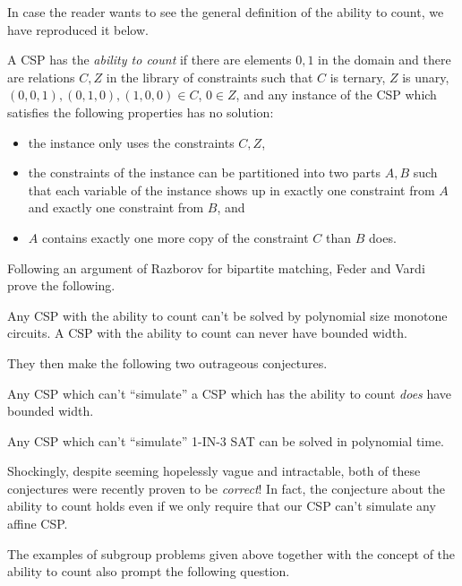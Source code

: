 \documentclass[letterpaper,11pt]{article}
\begin{document}
In case the reader wants to see the general definition of the ability to count, we have reproduced it below.

\begin{defn} A CSP has the \emph{ability to count} if there are elements $0,1$ in the domain and there are relations $C, Z$ in the library of constraints such that $C$ is ternary, $Z$ is unary, $(0,0,1),(0,1,0),(1,0,0) \in C$, $0 \in Z$, and any instance of the CSP which satisfies the following properties has no solution:
\begin{itemize}
\item the instance only uses the constraints $C, Z$,
\item the constraints of the instance can be partitioned into two parts $A, B$ such that each variable of the instance shows up in exactly one constraint from $A$ and exactly one constraint from $B$, and
\item $A$ contains exactly one more copy of the constraint $C$ than $B$ does.
\end{itemize}
\end{defn}

Following an argument of Razborov for bipartite matching, Feder and Vardi prove the following.

\begin{thm} Any CSP with the ability to count can't be solved by polynomial size monotone circuits. A CSP with the ability to count can never have bounded width.
\end{thm}

They then make the following two outrageous conjectures.

\begin{conj} Any CSP which can't ``simulate'' a CSP which has the ability to count \emph{does} have bounded width.
\end{conj}

\begin{conj} Any CSP which can't ``simulate'' 1-IN-3 SAT can be solved in polynomial time.
\end{conj}

Shockingly, despite seeming hopelessly vague and intractable, both of these conjectures were recently proven to be \emph{correct}! In fact, the conjecture about the ability to count holds even if we only require that our CSP can't simulate any affine CSP.

The examples of subgroup problems given above together with the concept of the ability to count also prompt the following question.
\end{document}
